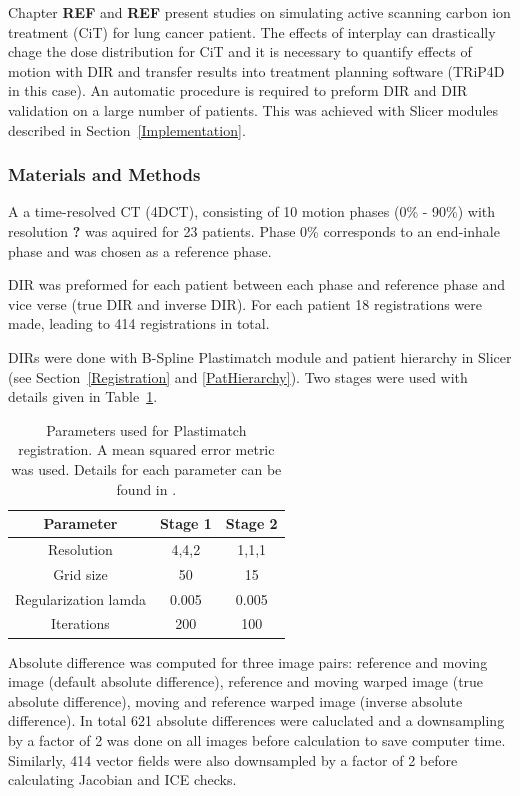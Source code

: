 \documentclass[type=dr, dr=rernat, accentcolor=tud7b,colorbacktitle, bigchapter, openright, twoside, 12pt ]{tudthesis}
\begin{document}
Chapter \textbf{REF} and \textbf{REF} present studies on simulating active scanning carbon ion treatment (CiT) for lung cancer patient. The effects of interplay can drastically chage the dose distribution for CiT and it is necessary to quantify effects of motion with DIR and transfer results into
treatment planning software (TRiP4D in this case). An automatic procedure is required to preform DIR and DIR validation on a large number of patients. This was achieved with Slicer modules described in Section~\ref{Implementation}.

\subsubsection{Materials and Methods}

A a time-resolved CT (4DCT), consisting of 10 motion phases (0\% - 90\%) with resolution \textbf{?} was aquired for 23 patients.
Phase 0\% corresponds to an end-inhale phase and was chosen as a reference phase.

DIR was preformed for each patient between each phase and reference phase and vice verse (true DIR and inverse DIR). For each patient 18 registrations were made, leading to 414 registrations in total.

DIRs were done with B-Spline Plastimatch module and patient hierarchy in Slicer (see Section~\ref{Registration} and \ref{PatHierarchy}). Two stages were used with details given in Table~\ref{tab:stages}. 

\begin{table}[H]
  \centering
  \caption{Parameters used for Plastimatch registration. A mean squared error metric was used. Details for each parameter can be found in \cite{Plastimatch}.}
  \begin{tabular}{c|c|c}
      Parameter & Stage 1 & Stage 2 \\
      \hline
      Resolution & 4,4,2 & 1,1,1 \\
      Grid size & 50 & 15 \\
      Regularization lamda & 0.005 & 0.005 \\
      Iterations & 200 & 100 \\
    \hline\hline
  \end{tabular}
  \label{tab:stages}
\end{table}

Absolute difference was computed for three image pairs: reference and moving image (default absolute difference), reference and moving warped image (true absolute difference), moving and reference warped image (inverse absolute difference). In total 621 absolute differences were caluclated and a downsampling by a factor of 2 was
done on all images before calculation to save computer time. Similarly, 414 vector fields were also downsampled by a factor of 2 before calculating Jacobian and ICE checks.
\end{document}
